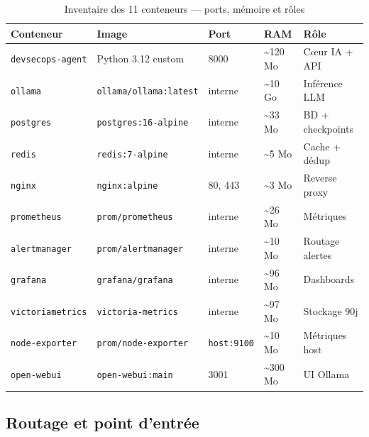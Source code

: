         \begin{table}[H]
        \centering
        \begin{tabular}{|m{3.5cm}|m{3cm}|m{2cm}|m{2cm}|m{2.5cm}|}
        \hline
        \textbf{Conteneur} & \textbf{Image} & \textbf{Port} & \textbf{RAM} & \textbf{Rôle} \\
        \hline
        \texttt{devsecops-agent} & Python 3.12 custom & 8000 & \textasciitilde120 Mo & Cœur IA + API \\
        \hline
        \texttt{ollama} & \texttt{ollama/\allowbreak{}ollama:latest} & interne & \textasciitilde10 Go & Inférence LLM \\
        \hline
        \texttt{postgres} & \texttt{postgres:16-alpine} & interne & \textasciitilde33 Mo & BD + checkpoints \\
        \hline
        \texttt{redis} & \texttt{redis:7-alpine} & interne & \textasciitilde5 Mo & Cache + dédup \\
        \hline
        \texttt{nginx} & \texttt{nginx:alpine} & 80, 443 & \textasciitilde3 Mo & Reverse proxy \\
        \hline
        \texttt{prometheus} & \texttt{prom/\allowbreak{}prometheus} & interne & \textasciitilde26 Mo & Métriques \\
        \hline
        \texttt{alertmanager} & \texttt{prom/\allowbreak{}alertmanager} & interne & \textasciitilde10 Mo & Routage alertes \\
        \hline
        \texttt{grafana} & \texttt{grafana/\allowbreak{}grafana} & interne & \textasciitilde96 Mo & Dashboards \\
        \hline
        \texttt{victoriametrics} & \texttt{victoria-metrics} & interne & \textasciitilde97 Mo & Stockage 90j \\
        \hline
        \texttt{node-exporter} & \texttt{prom/\allowbreak{}node-exporter} & \texttt{host:9100} & \textasciitilde10 Mo & Métriques host \\
        \hline
        \texttt{open-webui} & \texttt{open-webui:main} & 3001 & \textasciitilde300 Mo & UI Ollama \\
        \hline
        \end{tabular}
        \caption{Inventaire des 11 conteneurs — ports, mémoire et rôles}
        \label{tab:containers}
        \end{table}

    \subsection{Routage et point d'entrée}

